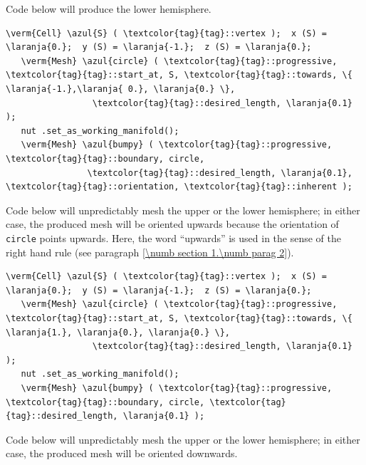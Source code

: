 Code below will produce the lower hemisphere.

\begin{Verbatim}[commandchars=\\\{\},formatcom=\small\tt,
   baselinestretch=0.94,framesep=2mm                      ]
   \verm{Cell} \azul{S} ( \textcolor{tag}{tag}::vertex );  x (S) = \laranja{0.};  y (S) = \laranja{-1.};  z (S) = \laranja{0.};
   \verm{Mesh} \azul{circle} ( \textcolor{tag}{tag}::progressive, \textcolor{tag}{tag}::start_at, S, \textcolor{tag}{tag}::towards, \{ \laranja{-1.},\laranja{ 0.}, \laranja{0.} \},
                 \textcolor{tag}{tag}::desired_length, \laranja{0.1}                                          );
   nut .set_as_working_manifold();
   \verm{Mesh} \azul{bumpy} ( \textcolor{tag}{tag}::progressive, \textcolor{tag}{tag}::boundary, circle,
                \textcolor{tag}{tag}::desired_length, \laranja{0.1}, \textcolor{tag}{tag}::orientation, \textcolor{tag}{tag}::inherent );
\end{Verbatim}

Code below will unpredictably mesh the upper or the lower hemisphere;
in either case, the produced mesh will be oriented upwards because the orientation
of {\small\tt circle} points upwards.
Here, the word ``upwards'' is used in the sense of the right hand rule
(see paragraph \ref{\numb section 1.\numb parag 2}).

\begin{Verbatim}[commandchars=\\\{\},formatcom=\small\tt,
   baselinestretch=0.94,framesep=2mm                     ]
   \verm{Cell} \azul{S} ( \textcolor{tag}{tag}::vertex );  x (S) = \laranja{0.};  y (S) = \laranja{-1.};  z (S) = \laranja{0.};
   \verm{Mesh} \azul{circle} ( \textcolor{tag}{tag}::progressive, \textcolor{tag}{tag}::start_at, S, \textcolor{tag}{tag}::towards, \{ \laranja{1.}, \laranja{0.}, \laranja{0.} \},
                 \textcolor{tag}{tag}::desired_length, \laranja{0.1}                                         );
   nut .set_as_working_manifold();
   \verm{Mesh} \azul{bumpy} ( \textcolor{tag}{tag}::progressive, \textcolor{tag}{tag}::boundary, circle, \textcolor{tag}{tag}::desired_length, \laranja{0.1} );
\end{Verbatim}

Code below will unpredictably mesh the upper or the lower hemisphere;
in either case, the produced mesh will be oriented downwards.

